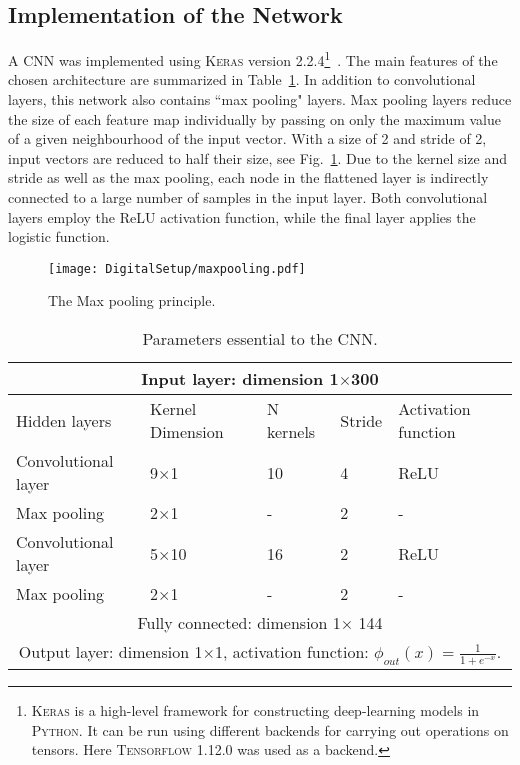 \documentclass[main.tex]{subfiles}
\begin{document}
\subsection{Implementation of the Network}
A CNN was implemented using \textsc{Keras} version 2.2.4\footnote{\textsc{Keras} is a high-level framework for constructing deep-learning models in \textsc{Python}. It can be run using different backends for carrying out operations on tensors. Here \textsc{Tensorflow} 1.12.0 was used as a backend.}~\cite{keras}. The main features of the chosen architecture are summarized in Table~\ref{tab:architecture}. In addition to convolutional layers, this network also contains ``max pooling" layers. Max pooling layers reduce the size of each feature map individually by passing on only the maximum value of a given neighbourhood of the input vector. With a size of 2 and stride of 2, input vectors are reduced to half their size, see Fig.~\ref{fig:maxpooking}. Due to the kernel size and stride as well as the max pooling, each node in the flattened layer is indirectly connected to a large number of samples in the input layer. Both convolutional layers employ the ReLU activation function, while the final layer applies the logistic function.
\begin{figure}[ht!]
    \centering
        \texttt{[image: DigitalSetup/maxpooling.pdf]}
        \caption[The Max pooling principle.]{The Max pooling principle.}
    \label{fig:maxpooking} 
\end{figure}

\begin{table}[h]
\center
\begin{tabular}{|l|l|l|l|l|}
\hline
\multicolumn{5}{|c|}{Input layer: dimension 1$\times$300}                                            \\ \hline
Hidden layers       & Kernel Dimension & N kernels & Stride & Activation function \\ \hline
Convolutional layer & 9$\times$1           & 10                & 4             & ReLU                \\ \hline
Max pooling          & 2$\times$1           & -                 & 2             & -                   \\ \hline
Convolutional layer & 5$\times$10           & 16                & 2             & ReLU                \\ \hline
Max pooling          & 2$\times$1           & -                 & 2             & -                   \\ \hline
\multicolumn{5}{|c|}{Fully connected: dimension 1$\times$ 144}
\\ \hline
\multicolumn{5}{|c|}{Output layer: dimension 1$\times$1, activation function: 	$\phi_{out}(x) = \frac{1}{1+e^{-x}}$.
}               \\ \hline
\end{tabular}
\caption{Parameters essential to the CNN.}
\label{tab:architecture}
\end{table}
\end{document}
